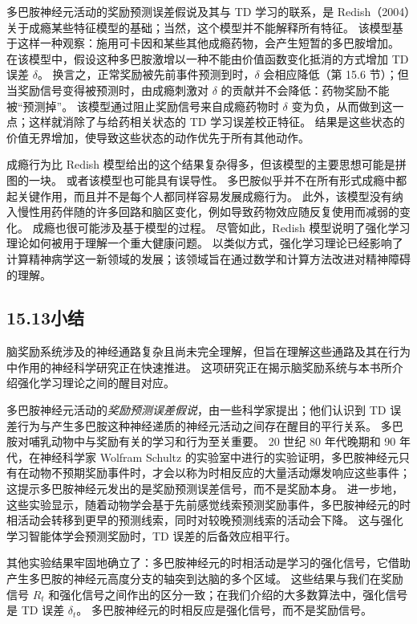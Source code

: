 \documentclass[UTF8,12pt,a4paper,fontset=fandol]{ctexart}
\begin{document}
多巴胺神经元活动的奖励预测误差假说及其与 TD 学习的联系，是 Redish（2004）关于成瘾某些特征模型的基础；当然，这个模型并不能解释所有特征。
该模型基于这样一种观察：施用可卡因和某些其他成瘾药物，会产生短暂的多巴胺增加。
在该模型中，假设这种多巴胺激增以一种不能由价值函数变化抵消的方式增加 TD 误差 $\delta$。
换言之，正常奖励被先前事件预测到时，$\delta$ 会相应降低（第 15.6 节）；但当奖励信号变得被预测时，由成瘾刺激对 $\delta$ 的贡献并不会降低：药物奖励不能被“预测掉”。
该模型通过阻止奖励信号来自成瘾药物时 $\delta$ 变为负，从而做到这一点；这样就消除了与给药相关状态的 TD 学习误差校正特征。
结果是这些状态的价值无界增加，使导致这些状态的动作优先于所有其他动作。

成瘾行为比 Redish 模型给出的这个结果复杂得多，但该模型的主要思想可能是拼图的一块。
或者该模型也可能具有误导性。
多巴胺似乎并不在所有形式成瘾中都起关键作用，而且并不是每个人都同样容易发展成瘾行为。
此外，该模型没有纳入慢性用药伴随的许多回路和脑区变化，例如导致药物效应随反复使用而减弱的变化。
成瘾也很可能涉及基于模型的过程。
尽管如此，Redish 模型说明了强化学习理论如何被用于理解一个重大健康问题。
以类似方式，强化学习理论已经影响了计算精神病学这一新领域的发展；该领域旨在通过数学和计算方法改进对精神障碍的理解。

\subsection*{15.13\quad 小结}

脑奖励系统涉及的神经通路复杂且尚未完全理解，但旨在理解这些通路及其在行为中作用的神经科学研究正在快速推进。
这项研究正在揭示脑奖励系统与本书所介绍强化学习理论之间的醒目对应。

多巴胺神经元活动的\textit{奖励预测误差假说}，由一些科学家提出；他们认识到 TD 误差行为与产生多巴胺这种神经递质的神经元活动之间存在醒目的平行关系。
多巴胺对哺乳动物中与奖励有关的学习和行为至关重要。
20 世纪 80 年代晚期和 90 年代，在神经科学家 Wolfram Schultz 的实验室中进行的实验证明，多巴胺神经元只有在动物不预期奖励事件时，才会以称为时相反应的大量活动爆发响应这些事件；这提示多巴胺神经元发出的是奖励预测误差信号，而不是奖励本身。
进一步地，这些实验显示，随着动物学会基于先前感觉线索预测奖励事件，多巴胺神经元的时相活动会转移到更早的预测线索，同时对较晚预测线索的活动会下降。
这与强化学习智能体学会预测奖励时，TD 误差的后备效应相平行。

其他实验结果牢固地确立了：多巴胺神经元的时相活动是学习的强化信号，它借助产生多巴胺的神经元高度分支的轴突到达脑的多个区域。
这些结果与我们在奖励信号 $R_t$ 和强化信号之间作出的区分一致；在我们介绍的大多数算法中，强化信号是 TD 误差 $\delta_t$。
多巴胺神经元的时相反应是强化信号，而不是奖励信号。
\end{document}
